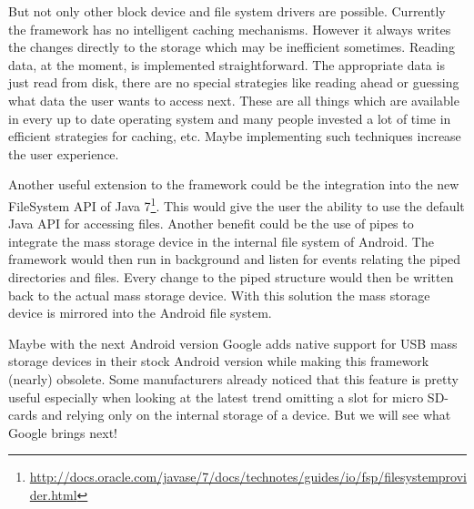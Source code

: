 But not only other block device and file system drivers are possible. Currently the framework has no intelligent caching mechanisms. However it always writes the changes directly to the storage which may be inefficient sometimes. Reading data, at the moment, is implemented straightforward. The appropriate data is just read from disk, there are no special strategies like reading ahead or guessing what data the user wants to access next. These are all things which are available in every up to date operating system and many people invested a lot of time in efficient strategies for caching, etc. Maybe implementing such techniques increase the user experience.

Another useful extension to the framework could be the integration into the new FileSystem API of Java 7\footnote{\url{http://docs.oracle.com/javase/7/docs/technotes/guides/io/fsp/filesystemprovider.html}}. This would give the user the ability to use the default Java API for accessing files. Another benefit could be the use of pipes to integrate the mass storage device in the internal file system of Android. The framework would then run in background and listen for events relating the piped directories and files. Every change to the piped structure would then be written back to the actual mass storage device. With this solution the mass storage device is mirrored into the Android file system.

Maybe with the next Android version Google adds native support for USB mass storage devices in their stock Android version while making this framework (nearly) obsolete. Some manufacturers already noticed that this feature is pretty useful especially when looking at the latest trend omitting a slot for micro SD-cards and relying only on the internal storage of a device. But we will see what Google brings next!